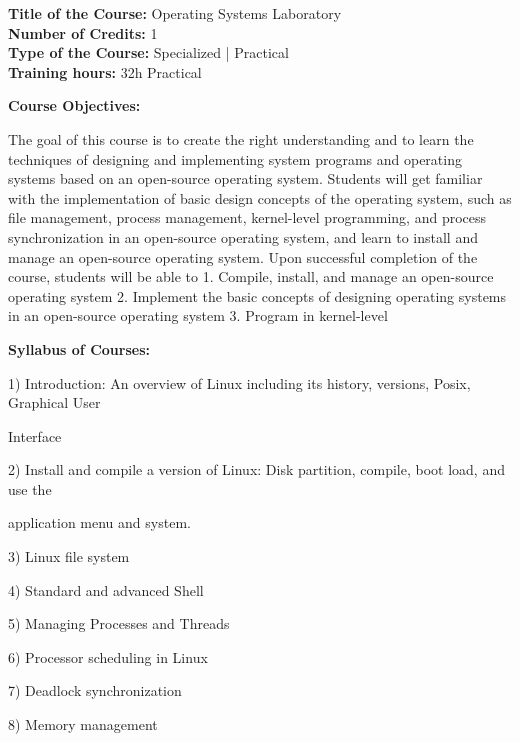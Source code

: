 \documentclass[12pt,a4paper]{article}
\begin{document}
\newpage
\textbf{Title of the Course:} Operating Systems Laboratory\\
\textbf{Number of Credits:} 1\\
\textbf{Type of the Course:} Specialized | Practical\\
\textbf{Training hours:} 32h Practical\par\vspace{4pt}
\textbf{Course Objectives:}\par\vspace{2pt}
The goal of this course is to create the right understanding and to learn the techniques of designing
and implementing system programs and operating systems based on an open-source operating
system. Students will get familiar with the implementation of basic design concepts of the
operating system, such as file management, process management, kernel-level programming, and
process synchronization in an open-source operating system, and learn to install and manage an
open-source operating system.
Upon successful completion of the course, students will be able to
1. Compile, install, and manage an open-source operating system
2. Implement the basic concepts of designing operating systems in an open-source operating
system
3. Program in kernel-level\par\vspace{4pt}
\textbf{Syllabus of Courses:}\par\vspace{2pt}
1) Introduction: An overview of Linux including its history, versions, Posix, Graphical User\par
Interface\par
2) Install and compile a version of Linux: Disk partition, compile, boot load, and use the\par
application menu and system.\par
3) Linux file system\par
4) Standard and advanced Shell\par
5) Managing Processes and Threads\par
6) Processor scheduling in Linux\par
7) Deadlock synchronization\par
8) Memory management\par\vspace{4pt}
\end{document}
